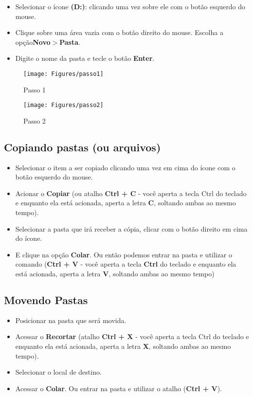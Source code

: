 \documentclass[hidelinks,12pt]{article}
\begin{document}
		\begin{itemize}
			\item Selecionar o ícone {\bf(D:)}: clicando uma vez sobre ele com o botão esquerdo do mouse.
			\item Clique sobre uma área vazia com o botão direito do mouse. Escolha a opção{\bf Novo$>$Pasta}.
			\item Digite o nome da pasta e tecle o botão {\bf Enter}.
		\end{itemize}
		
		\begin{figure}[!h]
			\centering
			\texttt{[image: Figures/passo1]}
			\caption{Passo 1}
			\label{fig:passo1}
		\end{figure}
		
		
		\begin{figure}[!h]
			\centering
			\texttt{[image: Figures/passo2]}
			\caption{Passo 2}
			\label{fig:passo2}
		\end{figure}
		
		\newpage
		\subsection{Copiando pastas (ou arquivos)}
		
		\begin{itemize}
			
			\item Selecionar o item a ser copiado clicando uma vez em cima do ícone com o botão esquerdo do mouse.
			\item Acionar o {\bf Copiar} (ou atalho {\bf Ctrl + C} - você aperta a tecla Ctrl do teclado e enquanto ela está acionada, aperta a letra {\bf C}, soltando ambas ao mesmo tempo).
			\item Selecionar a pasta que irá receber a cópia, clicar com o botão direito em cima do ícone.
			\item E clique na opção {\bf Colar}. Ou então podemos entrar na pasta e utilizar o comando ({\bf Ctrl + V} - você aperta a tecla {\bf Ctrl} do teclado e enquanto ela está acionada, aperta a letra {\bf V}, soltando ambas ao mesmo tempo)
		\end{itemize}
		
		\subsection{Movendo Pastas}
		
		\begin{itemize}
			\item Posicionar na pasta que será movida.
			\item Acessar o {\bf Recortar} (atalho {\bf Ctrl + X} - você aperta a tecla Ctrl do teclado e enquanto ela está acionada, aperta a letra {\bf X}, soltando ambas ao mesmo tempo).
			\item Selecionar o local de destino.
			\item Acessar o {\bf Colar}. Ou entrar na pasta e utilizar o atalho ({\bf Ctrl + V}).
		\end{itemize}
		
\end{document}
